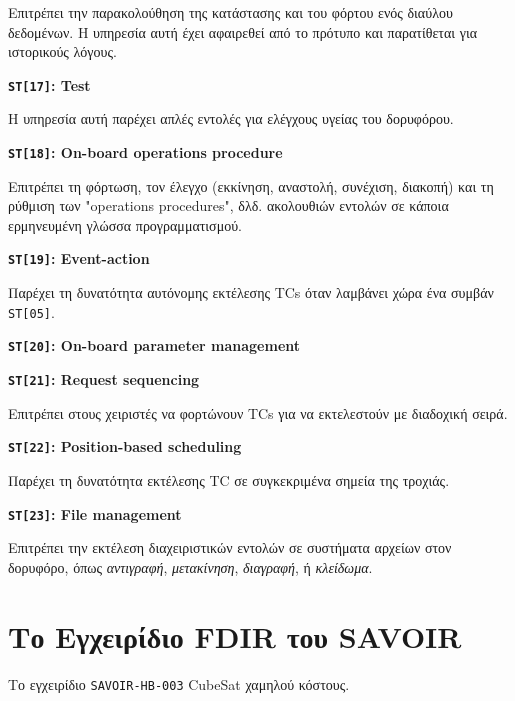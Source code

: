 \documentclass[a4paper,nobib]{tufte-book}
\begin{document}
\begin{compactitem}
		Επιτρέπει την παρακολούθηση της κατάστασης και του φόρτου ενός διαύλου δεδομένων. Η υπηρεσία αυτή έχει αφαιρεθεί από το πρότυπο και παρατίθεται για ιστορικούς λόγους.
		
		\item \textbf{\texttt{ST[17]}: Test}
		
		Η υπηρεσία αυτή παρέχει απλές εντολές για ελέγχους υγείας του δορυφόρου.
		
		\item \textbf{\texttt{ST[18]}: On-board operations procedure}
		
		Επιτρέπει τη φόρτωση, τον έλεγχο (εκκίνηση, αναστολή, συνέχιση, διακοπή) και τη ρύθμιση των "operations procedures", δλδ. ακολουθιών εντολών σε κάποια ερμηνευμένη γλώσσα προγραμματισμού.
		
		\item \textbf{\texttt{ST[19]}: Event-action}
		
		Παρέχει τη δυνατότητα αυτόνομης εκτέλεσης \acp{TC} όταν λαμβάνει χώρα ένα συμβάν \texttt{ST[05]}.
		
		\item \textbf{\texttt{ST[20]}: On-board parameter management}
		
		
		\item \textbf{\texttt{ST[21]}: Request sequencing}
		
		Επιτρέπει στους χειριστές να φορτώνουν \acp{TC} για να εκτελεστούν με διαδοχική σειρά.
		
		\item \textbf{\texttt{ST[22]}: Position-based scheduling}
		
		Παρέχει τη δυνατότητα εκτέλεσης \ac{TC} σε συγκεκριμένα σημεία της τροχιάς.
		
		\item \textbf{\texttt{ST[23]}: File management}
		
		Επιτρέπει την εκτέλεση διαχειριστικών εντολών σε συστήματα αρχείων στον δορυφόρο, όπως \emph{αντιγραφή}, \emph{μετακίνηση}, \emph{διαγραφή}, ή \emph{κλείδωμα}.
\end{compactitem}

\section{Το Εγχειρίδιο \acs{FDIR} του \acs{SAVOIR}}

Το εγχειρίδιο \texttt{SAVOIR-HB-003}  CubeSat χαμηλού κόστους.
\end{document}
